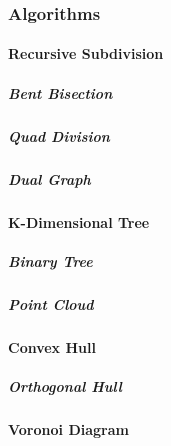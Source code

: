 \documentclass[a4paper,11pt]{report}
\begin{document}
        \lipsum[6-8]
        
        \subsubsection{Algorithms}
        
            \lipsum[6-8]
            
            \paragraph{Recursive Subdivision}
        
                \lipsum[6-8]
                
                \subparagraph{Bent Bisection}
                
                    \lipsum[6-8]
                    
                \subparagraph{Quad Division}
                
                    \lipsum[6-8]
                    
                \subparagraph{Dual Graph}
                
                    \lipsum[6-8]
                
            \paragraph{K-Dimensional Tree}
        
                \lipsum[6-8]
                
                \subparagraph{Binary Tree}
                
                    \lipsum[6-8]
                    
                \subparagraph{Point Cloud}
                
                    \lipsum[6-8]
                
            \paragraph{Convex Hull}
        
                \lipsum[6-8]
                
                \subparagraph{Orthogonal Hull}
                
                    \lipsum[6-8]
                
            \paragraph{Voronoi Diagram}
        
\end{document}
